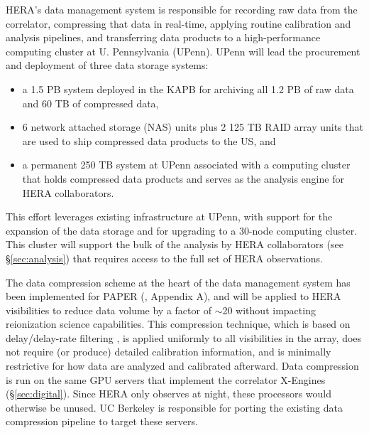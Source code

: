 \documentclass[preprint]{aastex}
\begin{document}
HERA's data management system is responsible for recording raw data from the
correlator, compressing that data in real-time, applying routine calibration
and analysis pipelines, and transferring data products to 
a high-performance computing cluster at U. Pennsylvania (UPenn).
UPenn will lead the procurement
and deployment of three data storage systems:
\begin{itemize}[noitemsep,nolistsep]
\item a 1.5 PB system deployed in the KAPB for archiving all 1.2 PB of raw data and 60 TB of compressed data, 
\item 6 network attached storage (NAS) units plus 2 125 TB RAID array units that are used to ship compressed data products to the US, and
\item a permanent 250 TB system at UPenn associated with a computing cluster that
holds compressed data products and serves as the analysis engine for HERA collaborators.
\end{itemize}
\noindent
This effort leverages existing infrastructure at UPenn, with support
for the expansion of the data storage and for upgrading to a 30-node computing cluster.  This cluster will support the bulk of the analysis by HERA collaborators (see \S\ref{sec:analysis}) that requires access to the full set of HERA observations.


The data compression scheme at the heart of the data management system
has been implemented for PAPER (\citealt{parsons_et_al2013},
Appendix A), and will be applied to HERA visibilities to reduce data volume by
a factor of $\sim$20 without impacting reionization science
capabilities.  This compression technique, which is based on delay/delay-rate
filtering \citep{parsons_backer2009}, is applied uniformly to all visibilities
in the array, does not require (or produce) detailed calibration
information, and is minimally restrictive for how data are analyzed and calibrated afterward.
Data compression is run on the same GPU servers
that implement the correlator X-Engines (\S\ref{sec:digital}).  Since HERA only observes at night,
these processors would otherwise be unused.  UC Berkeley is responsible for porting
the existing data compression pipeline to target these servers.
\end{document}
